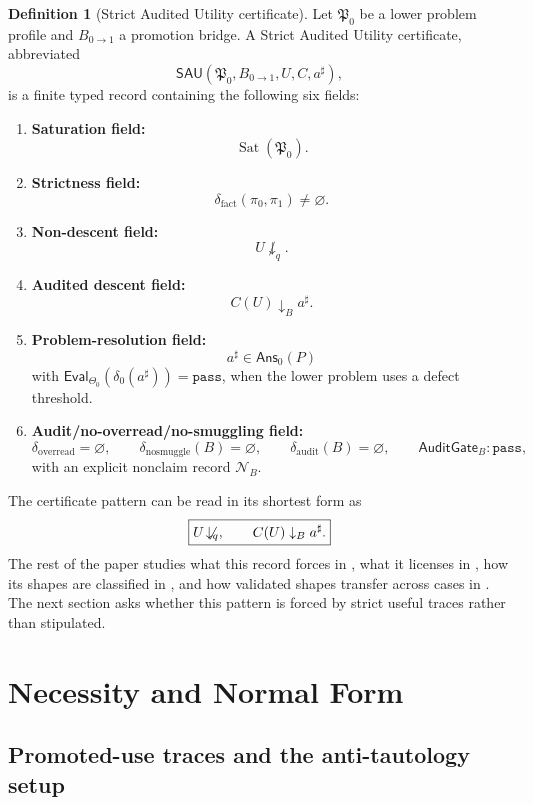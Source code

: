 \documentclass[11pt]{article}
\newcommand{\down}{\downarrow}
\newcommand{\ndown}{\not\!\downarrow}
\theoremstyle{definition}
\newtheorem{definition}[theorem]{Definition}
\begin{document}
\begin{definition}[Strict Audited Utility certificate]
\label{def:sau-certificate}
Let \(\mathfrak P_0\) be a lower problem profile and \(B_{0\to1}\) a promotion bridge. A Strict Audited Utility certificate, abbreviated
\[
\mathsf{SAU}(\mathfrak P_0,B_{0\to1},U,C,a^\sharp),
\]
is a finite typed record containing the following six fields:
\begin{enumerate}
\item \textbf{Saturation field:}
\[
\operatorname{Sat}(\mathfrak P_0).
\]
\item \textbf{Strictness field:}
\[
\delta_{\mathrm{fact}}(\pi_0,\pi_1)\neq\varnothing.
\]
\item \textbf{Non-descent field:}
\[
U\not\downarrow_q.
\]
\item \textbf{Audited descent field:}
\[
C(U)\downarrow_B a^\sharp.
\]
\item \textbf{Problem-resolution field:}
\[
a^\sharp\in\mathsf{Ans}_0(P)
\]
with \(\mathsf{Eval}_{\Theta_0}(\delta_0(a^\sharp))=\texttt{pass}\), when the lower problem uses a defect threshold.
\item \textbf{Audit/no-overread/no-smuggling field:}
\[
\delta_{\mathrm{overread}}=\varnothing,
\qquad
\delta_{\mathrm{nosmuggle}}(B)=\varnothing,
\qquad
\delta_{\mathrm{audit}}(B)=\varnothing,
\qquad
\mathsf{AuditGate}_B:\texttt{pass},
\]
with an explicit nonclaim record \(\mathcal N_B\).
\end{enumerate}
\end{definition}

The certificate pattern can be read in its shortest form as
\[
\boxed{U\ndown_q,\qquad C(U)\down_B a^\sharp.}
\]
The rest of the paper studies what this record forces in
, what it licenses in , how
its shapes are classified in , and how validated
shapes transfer across cases in .  The next section asks
whether this pattern is forced by strict useful traces rather than stipulated.
 \section{Necessity and Normal Form}\label{sec:necessity}

\subsection{Promoted-use traces and the anti-tautology setup}
\label{subsec:necessity-traces-setup}
\end{document}
